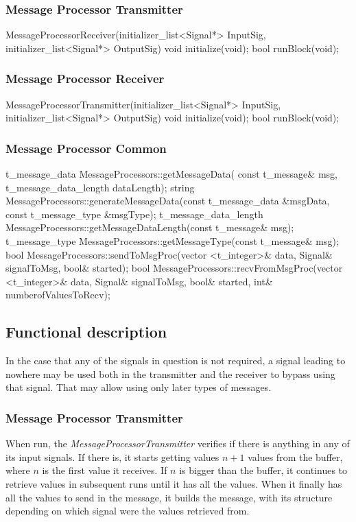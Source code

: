 \subsubsection*{Message Processor Transmitter}
\bigbreak
MessageProcessorReceiver(initializer\_list<Signal*> InputSig, initializer\_list<Signal*> OutputSig)
\bigbreak	
void initialize(void);
\bigbreak	
bool runBlock(void);
\bigbreak

\subsubsection*{Message Processor Receiver}
\bigbreak
MessageProcessorTransmitter(initializer\_list<Signal*> InputSig, initializer\_list<Signal*> OutputSig)
\bigbreak
void initialize(void);
\bigbreak
bool runBlock(void);
\bigbreak

\subsubsection*{Message Processor Common}
\bigbreak
t\_message\_data MessageProcessors::getMessageData( const t\_message\& msg,
t\_message\_data\_length dataLength);
\bigbreak
string MessageProcessors::generateMessageData(const t\_message\_data \&msgData,
const t\_message\_type \&msgType);
\bigbreak
t\_message\_data\_length MessageProcessors::getMessageDataLength(const t\_message\&
msg);
\bigbreak
t\_message\_type MessageProcessors::getMessageType(const t\_message\& msg);
\bigbreak
bool MessageProcessors::sendToMsgProc(vector <t\_integer>\& data, Signal\&
signalToMsg, bool\& started);
\bigbreak
bool MessageProcessors::recvFromMsgProc(vector <t\_integer>\& data, Signal\&
signalToMsg, bool\& started, int\& numberofValuesToRecv);
\bigbreak

\subsection*{Functional description}

In the case that any of the signals in question is not required, a signal
leading to nowhere may be used both in the transmitter and the receiver to
bypass using that signal. That may allow using only later types of messages.

\subsubsection*{Message Processor Transmitter}
When run, the \textit{MessageProcessorTransmitter} verifies if there is anything
in any of its input signals. If there is, it starts getting values $n+1$ values
from the buffer, where $n$ is the first value it receives. If $n$ is bigger than
the buffer, it continues to retrieve values in subsequent runs until it has all
the values. When it finally has all the values to send in the message, it builds
the message, with its structure depending on which signal were the values
retrieved from.

